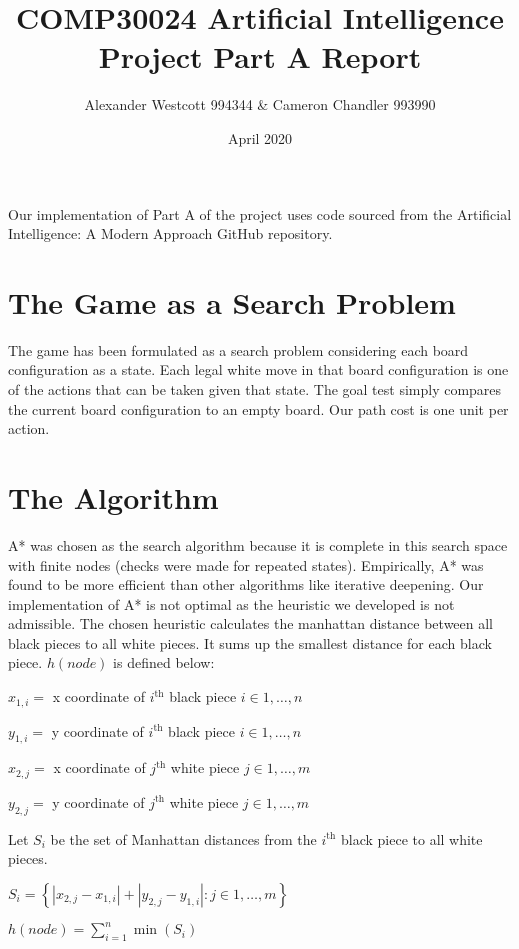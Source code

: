 \documentclass[a4paper,11pt]{article}
\author{Alexander Westcott 994344 \& Cameron Chandler 993990}
\title{COMP30024 Artificial Intelligence Project Part A Report}
\date{April 2020}
\begin{document}
\maketitle

Our implementation of Part A of the project uses code sourced from the
Artificial Intelligence: A Modern Approach GitHub repository. 

\section*{The Game as a Search Problem}

The game has been formulated as a search problem considering each board configuration as a state. 
Each legal white move in that board configuration is one of the actions that can be taken given that state. 
The goal test simply compares the current board configuration to an empty board. Our path cost is one unit per action. 

\section*{The Algorithm}

A* was chosen as the search algorithm because it is complete in this search space with finite nodes (checks were made for repeated states). 
Empirically, A* was found to be more efficient than other algorithms like iterative deepening. 
Our implementation of A* is not optimal as the heuristic we 
developed is not admissible. 
The chosen heuristic calculates the manhattan distance between all black pieces to all white pieces. 
It sums up the smallest distance for each black piece. $h(node)$ is defined below: \newline

$x_{1,i} =$ x coordinate of $i^{\text{th}}$ black piece $i \in {1,\dots,n}$

$y_{1,i} =$ y coordinate of $i^{\text{th}}$ black piece $i \in {1,\dots,n}$

$x_{2,j} =$ x coordinate of $j^{\text{th}}$ white piece $j \in {1,\dots,m}$

$y_{2,j} =$ y coordinate of $j^{\text{th}}$ white piece $j \in {1,\dots,m}$

Let $S_i$ be the set of Manhattan distances from the $i^{\text{th}}$ black piece to all white pieces.

$S_i = \left\{\left| x_{2,j} - x_{1,i}\right| + \left| y_{2,j} - y_{1,i}\right| :j \in 1,\dots,m\right\}$

$h(node) = \displaystyle\sum_{i=1}^n{\min\left(S_i\right)}$
\end{document}

